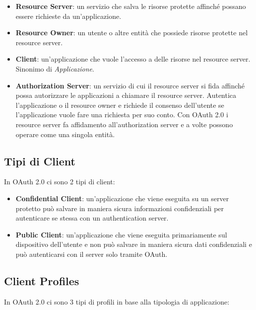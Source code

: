 \begin{itemize}
    \item \textbf{Resource Server}: un servizio che salva le risorse protette affinché
          possano essere richieste da un'applicazione.
    \item \textbf{Resource Owner}: un utente o altre entità che possiede risorse protette
          nel resource server.
    \item \textbf{Client}: un'applicazione che vuole l'accesso a delle risorse nel
          resource server. Sinonimo di \textit{Applicazione}.
    \item \textbf{Authorization Server}: un servizio di cui il resource server si fida
          affinché possa autorizzare le applicazioni a chiamare il resource server.
          Autentica l'applicazione o il resource owner e richiede il consenso dell'utente
          se l'applicazione
          vuole fare una richiesta per suo conto. Con OAuth 2.0 i resource server fa
          affidamento all'authorization server e a volte possono operare come una
          singola entità.
\end{itemize}

\subsection{Tipi di Client}

In OAuth 2.0 ci sono 2 tipi di client:

\begin{itemize}
    \item \textbf{Confidential Client}: un'applicazione che viene eseguita su un server
          protetto può salvare in maniera sicura informazioni confidenziali per
          autenticare se stessa con un authentication server.
    \item \textbf{Public Client}: un'applicazione che viene eseguita primariamente sul
          dispositivo dell'utente e non può salvare in maniera sicura dati confidenziali
          e può autenticarsi con il server solo tramite OAuth.
\end{itemize}

\subsection{Client Profiles}

In OAuth 2.0 ci sono 3 tipi di profili in base alla tipologia di applicazione:

